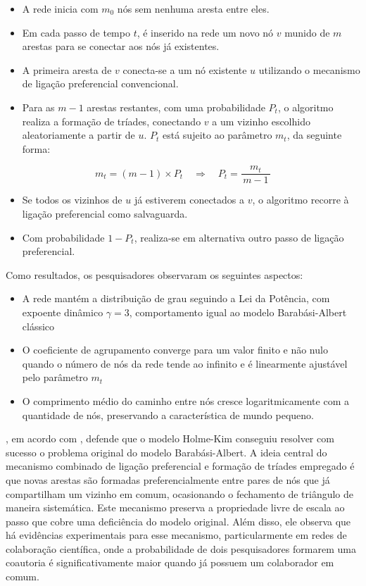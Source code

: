 \documentclass[12pt,oneside,a4paper,brazil,sumario=tradicional]{abntex2}
\begin{document}
\begin{itemize}
  \item A rede inicia com $m_{0}$ nós sem nenhuma aresta entre eles.
  \item Em cada passo de tempo $t$, é inserido na rede um novo nó $v$ munido de $m$ arestas para se conectar aos nós já existentes.
  \item A primeira aresta de $v$ conecta-se a um nó existente $u$ utilizando o mecanismo de ligação preferencial convencional.
  \item Para as $m - 1$ arestas restantes, com uma probabilidade $P_{t}$, o algoritmo realiza a formação de tríades, conectando $v$ a um vizinho escolhido aleatoriamente a partir de $u$. $P_{t}$ está sujeito ao parâmetro $m_{t}$, da seguinte forma:
\end{itemize}
\[m_{t} = (m-1)\times P_{t} \quad\Longrightarrow\quad P_{t} = \frac{m_{t}}{\,m-1\,}\]

\begin{itemize}
  \item Se todos os vizinhos de $u$ já estiverem conectados a $v$, o algoritmo recorre à ligação preferencial como salvaguarda.
  \item Com probabilidade $1 - P_{t}$, realiza-se em alternativa outro passo de ligação preferencial.
\end{itemize}

Como resultados, os pesquisadores observaram os seguintes aspectos:

\begin{itemize}
  \item A rede mantém a distribuição de grau seguindo a Lei da Potência, com expoente dinâmico $\gamma = 3$, comportamento igual ao modelo Barabási-Albert clássico
  \item O coeficiente de agrupamento converge para um valor finito e não nulo quando o número de nós da rede tende ao infinito e é linearmente ajustável pelo parâmetro $m_{t}$
  \item O comprimento médio do caminho entre nós cresce logaritmicamente com a quantidade de nós, preservando a característica de mundo pequeno.
\end{itemize}
\textcite{newman2003}, em acordo com \textcite{latora2017}, defende que o modelo Holme-Kim conseguiu resolver com sucesso o problema original do modelo Barabási-Albert. A ideia central do mecanismo combinado de ligação preferencial e formação de tríades empregado é que novas arestas são formadas preferencialmente entre pares de nós que já compartilham um vizinho em comum, ocasionando o fechamento de triângulo de maneira sistemática. Este mecanismo preserva a propriedade livre de escala ao passo que cobre uma deficiência do modelo original. Além disso, ele observa que há evidências experimentais para esse mecanismo, particularmente em redes de colaboração científica, onde a probabilidade de dois pesquisadores formarem uma coautoria é significativamente maior quando já possuem um colaborador em comum.
\end{document}
